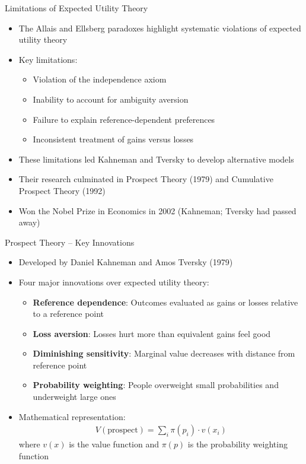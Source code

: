 \documentclass[10pt]{beamer}
\begin{document}
\begin{frame}{Limitations of Expected Utility Theory}
  \begin{itemize}[<+->]
    \item The Allais and Ellsberg paradoxes highlight systematic violations of expected utility theory
    \item Key limitations:
      \begin{itemize}
        \item Violation of the independence axiom
        \item Inability to account for ambiguity aversion
        \item Failure to explain reference-dependent preferences
        \item Inconsistent treatment of gains versus losses
      \end{itemize}
    \item These limitations led Kahneman and Tversky to develop alternative models
    \item Their research culminated in Prospect Theory (1979) and Cumulative Prospect Theory (1992)
    \item Won the Nobel Prize in Economics in 2002 (Kahneman; Tversky had passed away)
  \end{itemize}
\end{frame}

\begin{frame}{Prospect Theory -- Key Innovations}
  \begin{itemize}[<+->]
    \item Developed by Daniel Kahneman and Amos Tversky (1979)
    \item Four major innovations over expected utility theory:
      \begin{itemize}
        \item \textbf{Reference dependence}: Outcomes evaluated as gains or losses relative to a reference point
        \item \textbf{Loss aversion}: Losses hurt more than equivalent gains feel good
        \item \textbf{Diminishing sensitivity}: Marginal value decreases with distance from reference point
        \item \textbf{Probability weighting}: People overweight small probabilities and underweight large ones
      \end{itemize}
    \item Mathematical representation: 
      \begin{align*}
        V(\text{prospect}) = \sum_{i} \pi(p_i) \cdot v(x_i)
      \end{align*}
      where $v(x)$ is the value function and $\pi(p)$ is the probability weighting function
  \end{itemize}
\end{frame}
\end{document}
